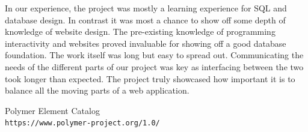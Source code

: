 \documentclass[letterpaper]{article}
\begin{document}
In our experience, the project was mostly a learning experience for SQL and database design.  In contrast it was most a chance to show off some depth of knowledge of website design.  The pre-existing knowledge of programming interactivity and websites proved invaluable for showing off a good database foundation.  The work itself was long but easy to spread out.  Communicating the needs of the different parts of our project was key as interfacing between the two took longer than expected.  The project truly showcased how important it is to balance all the moving parts of a web application.
\begin{thebibliography}{9}
Polymer Element Catalog\\
\texttt{https://www.polymer-project.org/1.0/}
\end{thebibliography}
\end{document}
